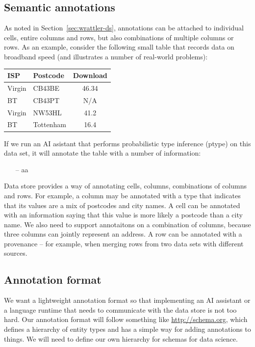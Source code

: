 \documentclass[sigplan,preprint,10pt]{acmart}\settopmatter{printfolios=true,printccs=false,printacmref=false}
\theoremstyle{plain}
\theoremstyle{definition}
\begin{document}
\subsection{Semantic annotations}
As noted in Section~\ref{sec:wrattler-ds}, annotations can be attached to individual cells, 
entire columns and rows, but also combinations of multiple columns or rows. As an example,
consider the following small table that records data on broadband speed (and illustrates a number
of real-world problems):

\vspace{1em}
\noindent
\begin{tabular}{llc}
\toprule
\textbf{ISP}\qquad\qquad\qquad & \textbf{Postcode}\qquad\qquad & \textbf{Download} \\
\midrule
Virgin & CB43BE & 46.34 \\
BT & CB43PT & N/A \\
Virgin & NW53HL & 41.2 \\
BT & Tottenham & 16.4 \\
\bottomrule
\end{tabular}
\vspace{1em}

\noindent
If we run an AI asistant that performs probabilistic type inference (ptype) on this data set,
it will annotate the table with a number of information:
\begin{itemize}
\item[--] aa
\end{itemize}

{\color{red}
Data store provides a way of annotating cells, columns, combinations of columns and rows.
For example, a column may be annotated with a type that indicates that its values are a mix of
postcodes and city names. A cell can be annotated with an information saying that this value is 
more likely a postcode than a city name. We also need to support annotaitons on a combination of
columns, because three columns can jointly represent an address. A row can be annotated with a 
provenance -- for example, when merging rows from two data sets with different sources.
}

\subsection{Annotation format}
{\color{red}
We want a lightweight annotation format so that implementing an AI assistant or a language
runtime that needs to communicate with the data store is not too hard.
Our annotation format will follow something like \url{http://schema.org}, which defines
a hierarchy of entity types and has a simple way for adding annotations to things.
We will need to define our own hierarchy for schemas for data science.
}
\end{document}
